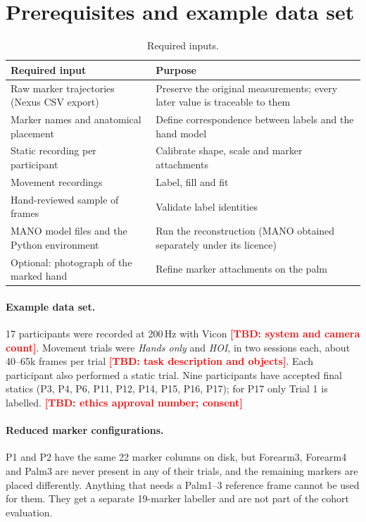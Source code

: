 \documentclass[11pt,a4paper]{article}
\newcommand{\tbd}[1]{\textcolor{red}{\textbf{[TBD: #1]}}}
\begin{document}
\section{Prerequisites and example data set}\label{sec:prereq}
\begin{table}[h]\centering\small
\caption{Required inputs.}\label{tab:inputs}
\begin{tabularx}{\linewidth}{@{}lX@{}}\toprule
Required input & Purpose \\\midrule
Raw marker trajectories (Nexus CSV export) & Preserve the original measurements; every later value is traceable to them \\
Marker names and anatomical placement & Define correspondence between labels and the hand model \\
Static recording per participant & Calibrate shape, scale and marker attachments \\
Movement recordings & Label, fill and fit \\
Hand-reviewed sample of frames & Validate label identities \\
MANO model files and the Python environment & Run the reconstruction (MANO obtained separately under its licence) \\
Optional: photograph of the marked hand & Refine marker attachments on the palm \\\bottomrule
\end{tabularx}
\end{table}

\paragraph{Example data set.} 17 participants were recorded at 200\,Hz with Vicon \tbd{system and camera count}.
Movement trials were \emph{Hands only} and \emph{HOI}, in two sessions each, about 40--65k frames per trial
\tbd{task description and objects}. Each participant also performed a static trial. Nine participants have accepted
final statics (P3, P4, P6, P11, P12, P14, P15, P16, P17); for P17 only Trial 1 is labelled.
\tbd{ethics approval number; consent}

\paragraph{Reduced marker configurations.} P1 and P2 have the same 22 marker columns on disk, but Forearm3, Forearm4
and Palm3 are never present in any of their trials, and the remaining markers are placed differently. Anything that
needs a Palm1--3 reference frame cannot be used for them. They get a separate 19-marker labeller and are not part of
the cohort evaluation.
\end{document}
